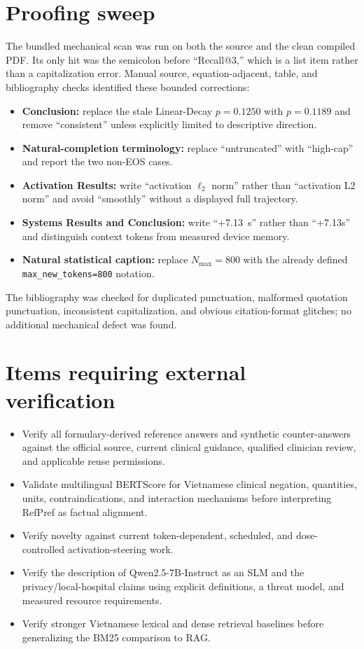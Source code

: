 \documentclass[11pt]{article}
\begin{document}
\section*{Proofing sweep}

The bundled mechanical scan was run on both the source and the clean compiled PDF.  Its only hit was the semicolon before ``Recall@3,'' which is a list item rather than a capitalization error.  Manual source, equation-adjacent, table, and bibliography checks identified these bounded corrections:

\begin{itemize}
    \item \textbf{Conclusion:} replace the stale Linear-Decay $p=0.1250$ with $p=0.1189$ and remove ``consistent'' unless explicitly limited to descriptive direction.
    \item \textbf{Natural-completion terminology:} replace ``untruncated'' with ``high-cap'' and report the two non-EOS cases.
    \item \textbf{Activation Results:} write ``activation $\ell_2$ norm'' rather than ``activation L2 norm'' and avoid ``smoothly'' without a displayed full trajectory.
    \item \textbf{Systems Results and Conclusion:} write ``+7.13~s'' rather than ``+7.13s'' and distinguish context tokens from measured device memory.
    \item \textbf{Natural statistical caption:} replace $N_{\text{max}}=800$ with the already defined \texttt{max\_new\_tokens=800} notation.
\end{itemize}

The bibliography was checked for duplicated punctuation, malformed quotation punctuation, inconsistent capitalization, and obvious citation-format glitches; no additional mechanical defect was found.

\section*{Items requiring external verification}

\begin{itemize}
    \item Verify all formulary-derived reference answers and synthetic counter-answers against the official source, current clinical guidance, qualified clinician review, and applicable reuse permissions.
    \item Validate multilingual BERTScore for Vietnamese clinical negation, quantities, units, contraindications, and interaction mechanisms before interpreting RefPref as factual alignment.
    \item Verify novelty against current token-dependent, scheduled, and dose-controlled activation-steering work.
    \item Verify the description of Qwen2.5-7B-Instruct as an SLM and the privacy/local-hospital claims using explicit definitions, a threat model, and measured resource requirements.
    \item Verify stronger Vietnamese lexical and dense retrieval baselines before generalizing the BM25 comparison to RAG.
\end{itemize}
\end{document}
